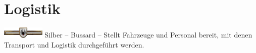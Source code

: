 \section{Logistik}
\includegraphics[width=20mm]{../img/truppenordnung/logistikMedevac/silber}\linebreak
Silber -- Bussard -- Stellt Fahrzeuge und Personal bereit, mit denen Transport und Logistik durchgeführt werden.